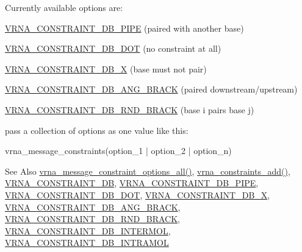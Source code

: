 Currently available options are\-:\par
\hyperlink{group__constraints_ga13053547a2de5532b64b64d35e097ae1}{V\-R\-N\-A\-\_\-\-C\-O\-N\-S\-T\-R\-A\-I\-N\-T\-\_\-\-D\-B\-\_\-\-P\-I\-P\-E} (paired with another base)\par
\hyperlink{group__constraints_ga369bea82eae75fbe626f409fa425747e}{V\-R\-N\-A\-\_\-\-C\-O\-N\-S\-T\-R\-A\-I\-N\-T\-\_\-\-D\-B\-\_\-\-D\-O\-T} (no constraint at all)\par
\hyperlink{group__constraints_ga7283bbe0f8954f7b030ecc3f2d1932b2}{V\-R\-N\-A\-\_\-\-C\-O\-N\-S\-T\-R\-A\-I\-N\-T\-\_\-\-D\-B\-\_\-\-X} (base must not pair)\par
\hyperlink{group__constraints_gad54c1315a47d55653dcaa5de6e544b77}{V\-R\-N\-A\-\_\-\-C\-O\-N\-S\-T\-R\-A\-I\-N\-T\-\_\-\-D\-B\-\_\-\-A\-N\-G\-\_\-\-B\-R\-A\-C\-K} (paired downstream/upstream)\par
\hyperlink{group__constraints_gac17b034852c914bc5879954c65d7e74b}{V\-R\-N\-A\-\_\-\-C\-O\-N\-S\-T\-R\-A\-I\-N\-T\-\_\-\-D\-B\-\_\-\-R\-N\-D\-\_\-\-B\-R\-A\-C\-K} (base i pairs base j)\par
 pass a collection of options as one value like this\-: \begin{DoxyVerb}vrna_message_constraints(option_1 | option_2 | option_n) \end{DoxyVerb}


\begin{DoxySeeAlso}{See Also}
\hyperlink{group__constraints_gaec7e13fa0465c2acc7a621d1aecb709f}{vrna\-\_\-message\-\_\-constraint\-\_\-options\-\_\-all()}, \hyperlink{group__constraints_ga35a401f680969a556858a8dd5f1d07cc}{vrna\-\_\-constraints\-\_\-add()}, \hyperlink{group__constraints_ga4bfc2f15c4f261c62a11af9d2aa80c90}{V\-R\-N\-A\-\_\-\-C\-O\-N\-S\-T\-R\-A\-I\-N\-T\-\_\-\-D\-B}, \hyperlink{group__constraints_ga13053547a2de5532b64b64d35e097ae1}{V\-R\-N\-A\-\_\-\-C\-O\-N\-S\-T\-R\-A\-I\-N\-T\-\_\-\-D\-B\-\_\-\-P\-I\-P\-E}, \hyperlink{group__constraints_ga369bea82eae75fbe626f409fa425747e}{V\-R\-N\-A\-\_\-\-C\-O\-N\-S\-T\-R\-A\-I\-N\-T\-\_\-\-D\-B\-\_\-\-D\-O\-T}, \hyperlink{group__constraints_ga7283bbe0f8954f7b030ecc3f2d1932b2}{V\-R\-N\-A\-\_\-\-C\-O\-N\-S\-T\-R\-A\-I\-N\-T\-\_\-\-D\-B\-\_\-\-X}, \hyperlink{group__constraints_gad54c1315a47d55653dcaa5de6e544b77}{V\-R\-N\-A\-\_\-\-C\-O\-N\-S\-T\-R\-A\-I\-N\-T\-\_\-\-D\-B\-\_\-\-A\-N\-G\-\_\-\-B\-R\-A\-C\-K}, \hyperlink{group__constraints_gac17b034852c914bc5879954c65d7e74b}{V\-R\-N\-A\-\_\-\-C\-O\-N\-S\-T\-R\-A\-I\-N\-T\-\_\-\-D\-B\-\_\-\-R\-N\-D\-\_\-\-B\-R\-A\-C\-K}, \hyperlink{group__constraints_ga31d0ebb9755ca8a4acafc14f00ca755d}{V\-R\-N\-A\-\_\-\-C\-O\-N\-S\-T\-R\-A\-I\-N\-T\-\_\-\-D\-B\-\_\-\-I\-N\-T\-E\-R\-M\-O\-L}, \hyperlink{group__constraints_ga5c17253f5a39d1d49b0fb11f5196982a}{V\-R\-N\-A\-\_\-\-C\-O\-N\-S\-T\-R\-A\-I\-N\-T\-\_\-\-D\-B\-\_\-\-I\-N\-T\-R\-A\-M\-O\-L}
\end{DoxySeeAlso}

